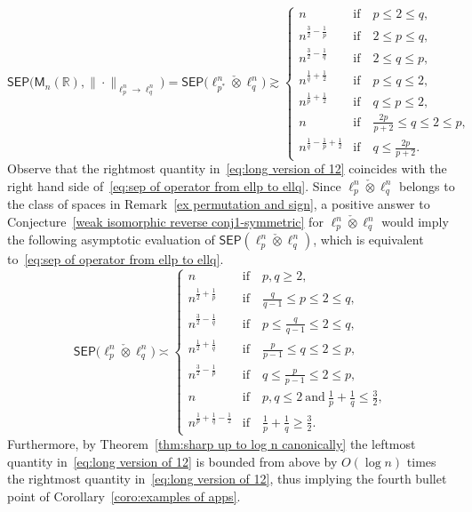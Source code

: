\documentclass[11pt,reqno]{amsart}
\renewcommand{\le}{\leqslant}
\renewcommand{\ge}{\geqslant}
\newcommand{\R}{\mathbb R}
\theoremstyle{remark}
\newcommand{\M}{\mathsf{M}}
\renewcommand{\1}{\mathbf 1}
\newcommand{\sep}{\mathsf{SEP}}
\newcommand{\ti}{\check{\otimes}}
\begin{document}
\begin{equation}\label{eq:long version of 12}
\sep\big(\M_n(\R),\|\cdot\|_{\ell_p^n\to \ell_q^n} \big)=\sep\big(\ell_{\!\! p^*}^n\ti\ell_q^n\big)\gtrsim \left\{\begin{array}{ll}n &\mathrm{if}\quad p\le 2\le q,\\
n^{\frac32-\frac{1}{p}}&\mathrm{if}\quad 2\le p\le q,\\
n^{\frac32-\frac1{q}}&\mathrm{if}\quad  2\le q\le p,\\
n^{\frac{1}{q}+\frac12}&\mathrm{if}\quad p\le q\le 2,\\
n^{\frac1{p}+\frac12}&\mathrm{if}\quad q\le p\le 2,\\
n &\mathrm{if}\quad \frac{2p}{p+2}\le q\le 2\le p,\\
n^{\frac{1}{q}-\frac{1}{p}+\frac12}&\mathrm{if}\quad q\le \frac{2p}{p+2}.
\end{array}\right.
\end{equation}
Observe that the rightmost quantity in~\eqref{eq:long version of 12} coincides with the right hand side of~\eqref{eq:sep of operator from ellp to ellq}. Since $\ell_p^n\ti \ell_q^n$ belongs to the class of spaces in Remark~\ref{ex permutation and sign}, a positive answer to Conjecture~\ref{weak isomorphic reverse conj1-symmetric}  for $\ell_p^n\ti \ell_q^n$ would imply the following asymptotic evaluation of $\sep(\ell_p^n\ti \ell_q^n)$, which is equivalent to~\eqref{eq:sep of operator from ellp to ellq}.
$$
\sep\big(\ell_p^n\ti \ell_q^n\big)\asymp \left\{\begin{array}{ll}n &\mathrm{if}\quad p,q\ge 2,\\
n^{\frac12+\frac{1}{p}}&\mathrm{if}\quad \frac{q}{q-1}\le p\le 2\le q,\\
n^{\frac32-\frac1{q}}&\mathrm{if}\quad p\le \frac{q}{q-1}\le 2\le q,\\
n^{\frac12+\frac{1}{q}}&\mathrm{if}\quad \frac{p}{p-1}\le q\le 2\le p,\\
n^{\frac32-\frac1{p}}&\mathrm{if}\quad q\le \frac{p}{p-1}\le 2\le p,\\
n &\mathrm{if}\quad p,q\le 2\ \mathrm{and}\  \frac{1}{p}+\frac{1}{q}\le \frac32,\\
n^{\frac{1}{p}+\frac{1}{q}-\frac12}&\mathrm{if}\quad \frac{1}{p}+\frac{1}{q}\ge \frac32.
\end{array}\right.
$$
Furthermore, by Theorem~\ref{thm:sharp up to log n canonically} the leftmost quantity in~\eqref{eq:long version of 12}  is bounded from above by $O(\log n)$ times the rightmost quantity in~\eqref{eq:long version of 12}, thus implying the fourth bullet point of Corollary~\ref{coro:examples of apps}.
\end{document}
